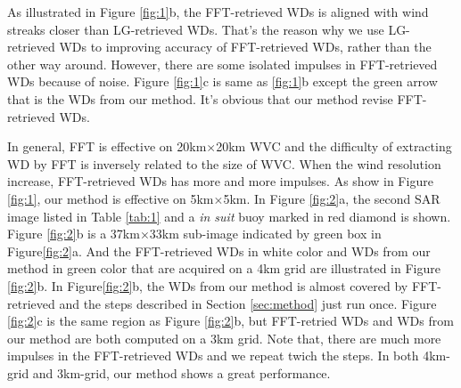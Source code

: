 \documentclass{article}
\begin{document}
As illustrated in Figure \ref{fig:1}b, the FFT-retrieved WDs is aligned with wind streaks closer than LG-retrieved WDs. That's the reason why we use LG-retrieved WDs to improving accuracy of FFT-retrieved WDs, rather than the other way around. However, there are some isolated impulses in FFT-retrieved WDs because of noise. Figure \ref{fig:1}c is same as \ref{fig:1}b except the green arrow that is the WDs from our method. It's obvious that our method revise FFT-retrieved WDs.

In general, FFT is effective on 20km$\times$20km  WVC and the difficulty of extracting WD by FFT is inversely related to the size of WVC\cite{Koch:2004fq}. When the wind resolution increase, FFT-retrieved WDs has more and more impulses. As show in Figure \ref{fig:1}, our method is effective on 5km$\times$5km. In Figure \ref{fig:2}a, the second SAR image listed in Table \ref{tab:1} and a {\it in suit} buoy marked in red diamond is shown. Figure \ref{fig:2}b is a 37km$\times$33km sub-image indicated by green box in Figure\ref{fig:2}a. And the FFT-retrieved WDs in white color and WDs from our method in green color that are acquired on a 4km grid are illustrated in Figure \ref{fig:2}b. In Figure\ref{fig:2}b, the WDs from our method is almost covered by FFT-retrieved and the steps described in Section \ref{sec:method} just run once. Figure \ref{fig:2}c is the same region as Figure \ref{fig:2}b, but FFT-retried WDs and WDs from our method are both computed on a 3km grid. Note that, there are much more impulses in the FFT-retrieved WDs and we repeat twich the steps. In both 4km-grid and 3km-grid, our method shows a great performance. 
\end{document}
